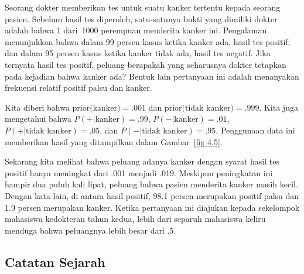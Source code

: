 \begin{example}\label{exam 4.11}
Seorang dokter memberikan tes untuk suatu kanker tertentu kepada seorang pasien.  Sebelum hasil
tes diperoleh, satu-satunya bukti yang dimiliki dokter adalah bahwa 1 dari~1000 perempuan menderita
kanker ini.  Pengalaman menunjukkan bahwa dalam 99 persen kasus ketika
kanker ada, hasil tes positif; dan dalam 95 persen kasus ketika
kanker tidak ada, hasil tes negatif.  Jika ternyata hasil tes positif,
peluang berapakah yang seharusnya dokter tetapkan pada kejadian bahwa kanker ada? 
Bentuk lain pertanyaan ini adalah menanyakan frekuensi relatif positif 
palsu dan kanker.

Kita diberi bahwa %
$\mbox{prior(kanker)} = .001$ dan
$\mbox{prior(tidak\ kanker)} = .999$.  Kita juga mengetahui bahwa $P(+| \mbox{kanker}) =
.99$, $P(-|\mbox{kanker}) = .01$, $P(+|\mbox{tidak\ kanker}) = .05$, dan
$P(-|\mbox{tidak\ kanker}) = .95$.  Penggunaan data ini memberikan hasil yang ditampilkan dalam
Gambar~\ref{fig 4.5}.


Sekarang kita melihat bahwa peluang adanya kanker dengan syarat hasil tes positif hanya
meningkat dari .001 menjadi .019.  Meskipun peningkatan ini hampir dua puluh kali lipat,
peluang bahwa pasien menderita kanker masih kecil.  Dengan kata lain,
di antara hasil positif, 98.1 persen merupakan positif palsu dan 1.9 persen merupakan 
kanker.  Ketika pertanyaan ini diajukan kepada sekelompok mahasiswa kedokteran tahun kedua, lebih dari separuh
mahasiswa keliru menduga bahwa peluangnya lebih besar dari .5.  
\end{example}

\subsection*{Catatan Sejarah}

